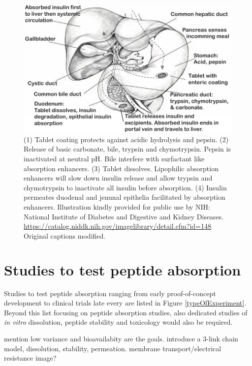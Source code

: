 \begin{figure}[h]

\includegraphics{graphics/intro_anatomy2.pdf}
\caption{(1) Tablet coating protects against acidic hydrolysis and pepsin. (2) Release of basic carbonate, bile, trypsin and chymotrypsin. Pepsin is inactivated at neutral pH. Bile interfere with surfactant like absorption enhancers. (3) Tablet dissolves. Lipophilic absorption enhancers will slow down insulin release and allow trypsin and chymotrypsin to inactivate all insulin before absorption. (4) Insulin permeates duodenal and jenunal epithelia facilitated by absorption enhancers. Illustration kindly provided for public use by NIH: National Institute of Diabetes and Digestive and Kidney Diseases. \url{https://catalog.niddk.nih.gov/imagelibrary/detail.cfm?id=148} Original captions modified.}
\label{intro_glucoseTolerance}
\end{figure}

\section{Studies to test peptide absorption}
Studies to test peptide absorption ranging from early proof-of-concept development to clinical trials late every are listed in Figure \ref{typeOfExperiment}. Beyond this list focusing on peptide absorption studies, also dedicated studies of \textit{in vitro} dissolution, peptide stability and toxicology would also be required.

mention low variance and bioavailabity are the goals.
introduce a 3-link chain model, dissolution, stability, permeation. 
membrane transport/electrical resistance image?

